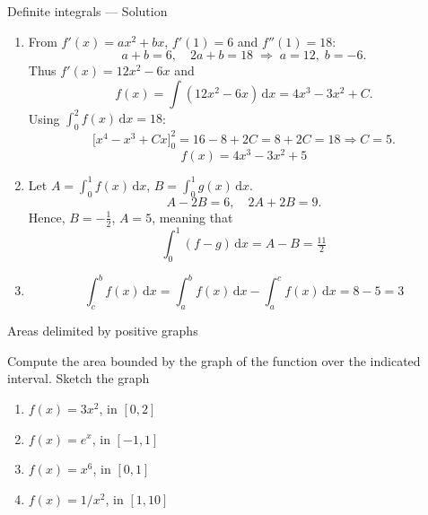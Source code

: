 \documentclass[9pt]{beamer}
\begin{document}
\begin{frame}{Definite integrals — Solution}
\small
\begin{enumerate}[leftmargin=0.5cm,label=\arabic*.,rightmargin=0.2cm]
      \item 
      From $f'(x) = ax^2 + bx$, $f'(1)=6$ and $f''(1)=18$:
      \[
      a+b=6,\quad 2a+b=18 \;\Rightarrow\; a=12,\; b=-6.
      \]
      Thus $f'(x)=12x^2-6x$ and
      \[
      f(x)=\int (12x^2-6x)\,\mathrm{d}x=4x^3-3x^2+C.
      \]
      Using $\int_0^2 f(x)\,\mathrm{d}x=18$:
      \[
      \big[x^4-x^3+Cx\big]_0^2=16-8+2C=8+2C=18 \Rightarrow C=5.
      \]
      \[
      \boxed{\,f(x)=4x^3-3x^2+5\,}
      \]
    
      \item Let $A=\int_0^1 f(x)\,\mathrm{d}x$, $B=\int_0^1 g(x)\,\mathrm{d}x$.
      \[
      A-2B=6,\quad 2A+2B=9.
      \]
      Hence, $B=-\tfrac12$, $A=5$, meaning that
      \[
      \boxed{\,\int_0^1 (f-g)\,\mathrm{d}x=A-B=\tfrac{11}{2}\,}
      \]
    
      \item \[
      \boxed{\,\int_c^b f(x)\,\mathrm{d}x=\int_a^b f(x)\,\mathrm{d}x - \int_a^c f(x)\,\mathrm{d}x =8-5=3\,}
      \]
    \end{enumerate}
\end{frame}


\begin{frame}{Areas delimited by positive graphs}

    Compute the area bounded by the graph of the function over the indicated interval. Sketch the graph

    \begin{enumerate}[leftmargin = 0.5cm, label = (\alph*), rightmargin = 0.2cm]

        \item $f(x) = 3x^2$, in $[0, 2]$

        \item $f(x) = e^{x}$, in $[-1, 1]$

        \item $f(x) = x^6$, in $[0, 1]$

        \item $f(x) = 1/x^2$, in $[1, 10]$
        
    \end{enumerate}
    
\end{frame}
\end{document}
